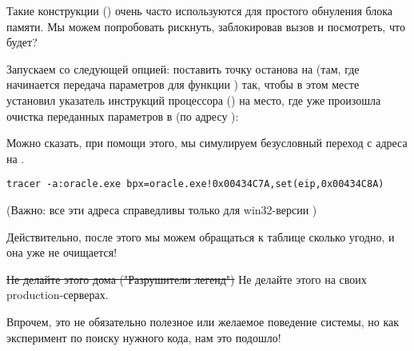 Такие конструкции () очень часто используются для простого обнуления блока памяти.
Мы можем попробовать рискнуть, заблокировав вызов  и посмотреть, что будет?

Запускаем \tracer со следующей опцией: поставить точку останова на  
(там, где начинается передача параметров для функции ) так, 
чтобы \tracer в этом месте установил указатель инструкций процессора () на место, где уже произошла очистка переданных параметров в  (по адресу ):

Можно сказать, при помощи этого, мы симулируем безусловный переход с адреса  на .

\begin{lstlisting}
tracer -a:oracle.exe bpx=oracle.exe!0x00434C7A,set(eip,0x00434C8A)
\end{lstlisting}

(Важно: все эти адреса справедливы только для win32-версии )

Действительно, после этого мы можем обращаться к таблице  сколько угодно, и она уже не очищается!

\sout{Не делайте этого дома ("Разрушители легенд")} Не делайте этого на своих production-серверах.

Впрочем, это не обязательно полезное или желаемое поведение системы, но как эксперимент по поиску нужного кода, нам это подошло!


